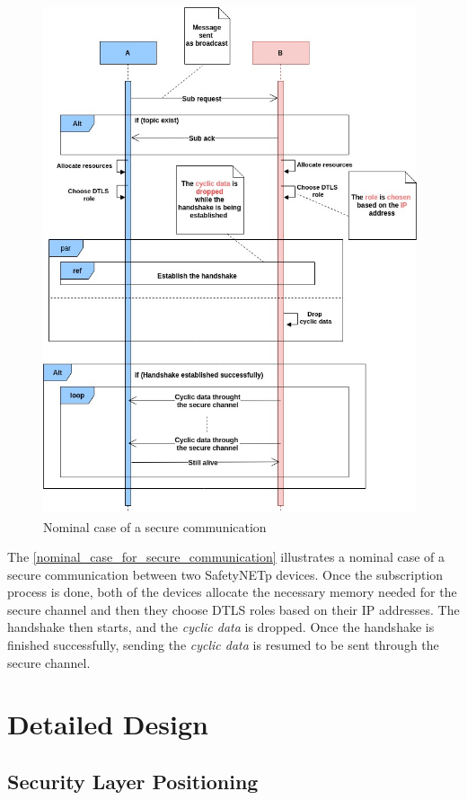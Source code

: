 \begin{figure}[!htbp]
\centering
\includegraphics[width=11cm,height=15cm]{figures/design/nominal_case_for_secure_communication.jpg}
\caption{Nominal case of a secure communication}\label{nominal_case_for_secure_communication}
\end{figure}



The \autoref{nominal_case_for_secure_communication} illustrates a nominal case of a secure communication between two SafetyNETp devices.
Once the subscription process is done, both of the devices allocate the necessary memory needed for the
secure channel and then they choose DTLS roles based on their IP addresses. The handshake then starts, and the \textit{cyclic data}
is dropped. Once the handshake is finished successfully, sending the \textit{cyclic data} is resumed to be sent
through the secure channel.

\section{Detailed Design}

\subsection{Security Layer Positioning}

